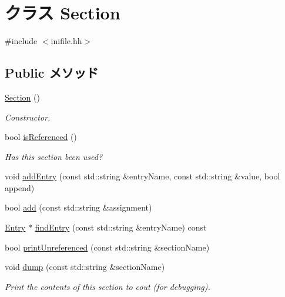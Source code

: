 \hypertarget{classIniFile_1_1Section}{
\section{クラス Section}
\label{classIniFile_1_1Section}
}


{\ttfamily \#include $<$inifile.hh$>$}\subsection*{Public メソッド}
\begin{DoxyCompactItemize}
\item 
\hyperlink{classIniFile_1_1Section_a431219dba705401fd07b93d3232656c6}{Section} ()
\begin{DoxyCompactList}\small\item\em Constructor. \item\end{DoxyCompactList}\item 
bool \hyperlink{classIniFile_1_1Section_a9bb33643f50132c7eb254763f4509d23}{isReferenced} ()
\begin{DoxyCompactList}\small\item\em Has this section been used? \item\end{DoxyCompactList}\item 
void \hyperlink{classIniFile_1_1Section_a413d316c230aa09f6a7ec81c0f6a0a3c}{addEntry} (const std::string \&entryName, const std::string \&value, bool append)
\item 
bool \hyperlink{classIniFile_1_1Section_a17a35c61f796d02d1071b18fcc5a8d5f}{add} (const std::string \&assignment)
\item 
\hyperlink{classIniFile_1_1Entry}{Entry} $\ast$ \hyperlink{classIniFile_1_1Section_afe23112a92c3a94832ec63c369cd7b95}{findEntry} (const std::string \&entryName) const 
\item 
bool \hyperlink{classIniFile_1_1Section_a0be8fad0417aca3b37c8b95877552a39}{printUnreferenced} (const std::string \&sectionName)
\item 
void \hyperlink{classIniFile_1_1Section_a249475ee201869af7bf1723fed47acd2}{dump} (const std::string \&sectionName)
\begin{DoxyCompactList}\small\item\em Print the contents of this section to cout (for debugging). \item\end{DoxyCompactList}\end{DoxyCompactItemize}
